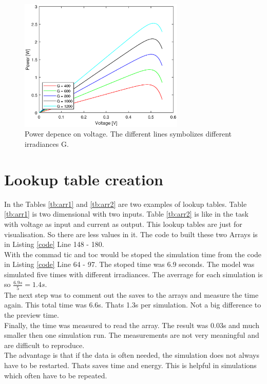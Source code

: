 		\begin{figure}[H]
			\centering
			\includegraphics[width=0.7\textwidth]{figures/xy_vp.eps}
			\caption{Power depence on voltage. The different lines symbolizes different irradiances G.}
			\label{fig:xy_vp}
		\end{figure}

\newpage
\section{Lookup table creation}
In the Tables \ref{tb:arr1} and \ref{tb:arr2} are two examples of lookup tables. Table \ref{tb:arr1} is two dimensional with two inputs. 
Table \ref{tb:arr2} is like in the task with voltage as input and current as output. This lookup tables are just for visualisation. So there are less values in it. The code to built these two  Arrays is in Listing \ref{code} Line 148 - 180.\\
With the commad tic and toc would be stoped the simulation time from the code in Listing \ref{code} Line 64 - 97. The stoped time was 6.9 seconds. The model was simulated five times with different irradiances. The averrage for each simulation is so $\frac{6.9s}{5} = 1.4s$. \\
The next step was to comment out the saves to the arrays and measure the time again. This total time was 6.6s. Thats 1.3s per simulation. Not a big difference to the preview time.\\
Finally, the time was measured to read the array. The result was 0.03s and much smaller then one simulation run. The measurements are not very meaningful and are difficult to reproduce. \\
The advantage is that if the data is often needed, the simulation does not always have to be restarted. Thats saves time and energy. This is helpful in simulations which often have to be repeated.



